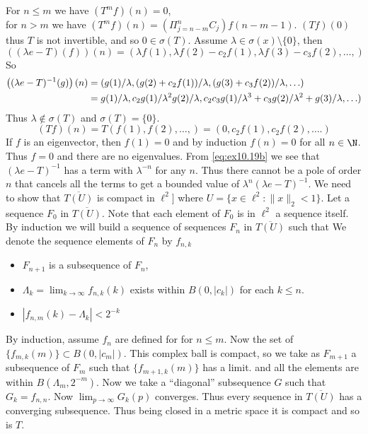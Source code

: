 \begin{enumerate}
\begin{itemize}
 For \(n \leq m\) we have \((T^m f)(n) = 0\),\\
  for \(n > m\)
  we have \((T^m f)(n) = \left(\Pi_{j=n-m}^n C_j\right)f(n-m-1)\).
 \((Tf)(0)\) thus $T$ is not invertible, and so \(0\in\sigma(T)\).
  Assume \(\lambda\in\sigma(x)\setminus\{0\}\), then
  \begin{equation*}
  ((\lambda e - T)(f))(n)
  = (\lambda f(1), \lambda f(2) - c_2 f(1), \lambda f(3) - c_3 f(2), \ldots,)
  \end{equation*}
  So
  \begin{align}
  \left((\lambda e - T)^{-1}(g)\right)(n)
  &= (g(1)/\lambda, (g(2) + c_2 f(1))/\lambda, (g(3) + c_3 f(2))/\lambda, \ldots)
  \notag \\
  &= g(1)/\lambda,
    c_2 g(1)/\lambda^2 g(2)/\lambda,
    c_2c_3 g(1)/\lambda^3 + c_3 g(2)/\lambda^2 + g(3)/\lambda, 
    \ldots) \label{eq:ex10.19b}
  \end{align}
  Thus \(\lambda \notin \sigma(T)\) and \(\sigma(T)=\{0\}\).
  \begin{equation*}
  (Tf)(n) = T(f(1),f(2),\ldots,) = (0, c_2f(1), c_2f(2), \ldots.)
  \end{equation*}
  If $f$ is an eigenvector, then \(f(1)=0\) and by induction \(f(n)=0\)
  for all \(n\in\N\). Thus \(f=0\) and there are no eigenvalues.
  From \eqref{eq:ex10.19b} we see that \((\lambda e - T)^{-1}\)
  has a term with \(\lambda^{-n}\) for any $n$.
  Thus there cannot be a pole of order $n$ that cancels all the terms
  to get a bounded value of \(\lambda^n (\lambda e - T)^{-1}\).
  We need to show that \(\overline{T(U)}\) is compact in \(\ell^2]\)
  where \(U=\{x\in \ell^2: \|x\|_2 < 1\}\).
  Let a sequence \(F_0\) in \(\overline{T(U)}\).
  Note that each element of \(F_0\) is in \(\ell^2\) a sequence itself.
  By induction we will build
  a sequence of sequences \(F_n\) in \(\overline{T(U)}\) such that
  We denote the sequence elements of \(F_n\) by \(f_{n,k}\)
  \begin{itemize}
  \item \(F_{n+1}\) is a subsequence of \(F_n\),
  \item \(\Lambda_k = \lim_{k\to\infty} f_{n,k}(k) \) exists within \(B(0,|c_k|)\)
        for each \(k \leq n\).
  \item \(|f_{n,m}(k) - \Lambda_k| < 2^{-k}\)
  \end{itemize}
  By induction, assume \(f_n\) are defined for for \(n\leq m\).
  Now the set of \(\{f_{m,k}(m)\} \subset B(0,|c_m|)\).
  This complex ball is compact, so we take as \(F_{m+1}\)
  a subsequence of \(F_m\) such that \(\{f_{m+1,k}(m)\}\) has a limit.
  and all the elements are within \(B(\Lambda_m,2^{-m})\).
  Now we take a ``diagonal'' subsequence $G$ such that \(G_k = f_{n,n}\).
  Now \(\lim_{p\to\infty} G_k(p)\) converges.
  Thus every sequence in \(\overline{T(U)}\) has a converging subsequence.
  Thus being closed in a metric space it is compact and so is $T$.
\end{itemize}


\end{enumerate}

